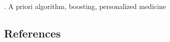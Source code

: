\documentclass[12pt]{article}
\begin{document}
.
A priori algorithm, boosting, personalized medicine 


%        
%
%        
\vspace{-0.5cm}
\subsection*{References}
\end{document}

